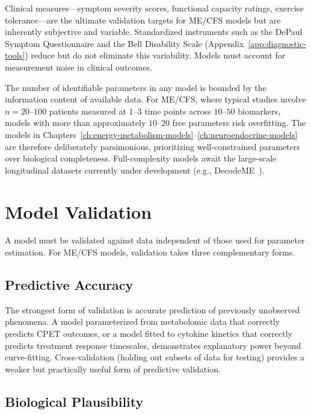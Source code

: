 Clinical measures---symptom severity scores, functional capacity ratings, exercise tolerance---are the ultimate validation targets for ME/CFS models but are inherently subjective and variable. Standardized instruments such as the DePaul Symptom Questionnaire and the Bell Disability Scale (Appendix~\ref{app:diagnostic-tools}) reduce but do not eliminate this variability. Models must account for measurement noise in clinical outcomes.

\begin{limitation}
The number of identifiable parameters in any model is bounded by the information content of available data. For ME/CFS, where typical studies involve $n = 20$--$100$ patients measured at $1$--$3$ time points across $10$--$50$ biomarkers, models with more than approximately $10$--$20$ free parameters risk overfitting. The models in Chapters~\ref{ch:energy-metabolism-models}--\ref{ch:neuroendocrine-models} are therefore deliberately parsimonious, prioritizing well-constrained parameters over biological completeness. Full-complexity models await the large-scale longitudinal datasets currently under development (e.g., DecodeME~\cite{DecodeME2025}).
\end{limitation}

\section{Model Validation}
\label{sec:model-validation}

A model must be validated against data independent of those used for parameter estimation. For ME/CFS models, validation takes three complementary forms.

\subsection{Predictive Accuracy}

The strongest form of validation is accurate prediction of previously unobserved phenomena. A model parameterized from metabolomic data that correctly predicts CPET outcomes, or a model fitted to cytokine kinetics that correctly predicts treatment response timescales, demonstrates explanatory power beyond curve-fitting. Cross-validation (holding out subsets of data for testing) provides a weaker but practically useful form of predictive validation.

\subsection{Biological Plausibility}


